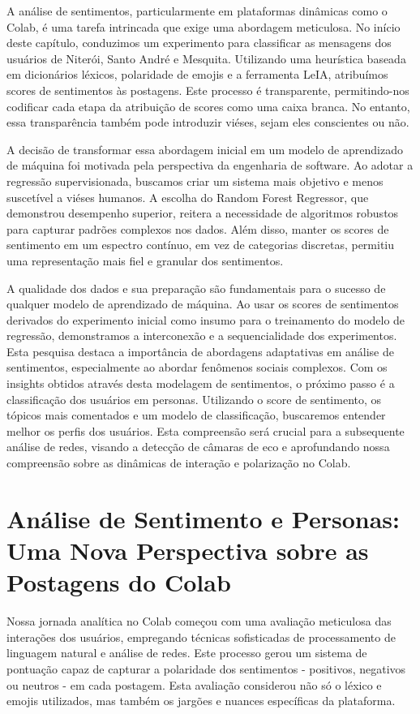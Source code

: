 A análise de sentimentos, particularmente em plataformas dinâmicas como o Colab, é uma tarefa intrincada que exige uma abordagem meticulosa. No início deste capítulo, conduzimos um experimento para classificar as mensagens dos usuários de Niterói, Santo André e Mesquita. Utilizando uma heurística baseada em dicionários léxicos, polaridade de emojis e a ferramenta LeIA, atribuímos scores de sentimentos às postagens. Este processo é transparente, permitindo-nos codificar cada etapa da atribuição de scores como uma caixa branca. No entanto, essa transparência também pode introduzir viéses, sejam eles conscientes ou não.

A decisão de transformar essa abordagem inicial em um modelo de aprendizado de máquina foi motivada pela perspectiva da engenharia de software. Ao adotar a regressão supervisionada, buscamos criar um sistema mais objetivo e menos suscetível a viéses humanos. A escolha do Random Forest Regressor, que demonstrou desempenho superior, reitera a necessidade de algoritmos robustos para capturar padrões complexos nos dados. Além disso, manter os scores de sentimento em um espectro contínuo, em vez de categorias discretas, permitiu uma representação mais fiel e granular dos sentimentos.

A qualidade dos dados e sua preparação são fundamentais para o sucesso de qualquer modelo de aprendizado de máquina. Ao usar os scores de sentimentos derivados do experimento inicial como insumo para o treinamento do modelo de regressão, demonstramos a interconexão e a sequencialidade dos experimentos. Esta pesquisa destaca a importância de abordagens adaptativas em análise de sentimentos, especialmente ao abordar fenômenos sociais complexos. Com os insights obtidos através desta modelagem de sentimentos, o próximo passo é a classificação dos usuários em personas. Utilizando o score de sentimento, os tópicos mais comentados e um modelo de classificação, buscaremos entender melhor os perfis dos usuários. Esta compreensão será crucial para a subsequente análise de redes, visando a detecção de câmaras de eco e aprofundando nossa compreensão sobre as dinâmicas de interação e polarização no Colab.

\section{Análise de Sentimento e Personas: Uma Nova Perspectiva sobre as Postagens do Colab}

Nossa jornada analítica no Colab começou com uma avaliação meticulosa das interações dos usuários, empregando técnicas sofisticadas de processamento de linguagem natural e análise de redes. Este processo gerou um sistema de pontuação capaz de capturar a polaridade dos sentimentos - positivos, negativos ou neutros - em cada postagem. Esta avaliação considerou não só o léxico e emojis utilizados, mas também os jargões e nuances específicas da plataforma.

